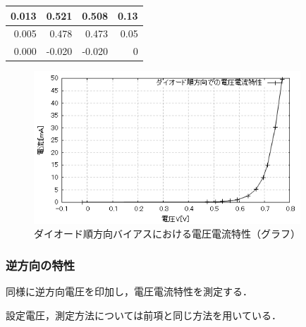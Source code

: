 \documentclass[titlepage]{jarticle}
\begin{document}
\begin{table}[htbp]
\begin{center}
\begin{tabular}{r|r|r|r}
            0.013                                    & 0.521                           & 0.508                                       & 0.13                         \\ \hline
            0.005                                    & 0.478                           & 0.473                                       & 0.05                         \\ \hline
            0.000                                    & -0.020                          & -0.020                                      & 0                            \\ \hline
        \end{tabular}
    \end{center}
    \label{ダイオード順方向バイアスにおける電圧電流特性測定結果}
\end{table}


\begin{figure}[H]
    \begin{center}
        \includegraphics[width=10cm]{graph/1.png}
        \caption{ダイオード順方向バイアスにおける電圧電流特性（グラフ）}
        \label{fig:ダイオード順方向バイアスにおける電圧電流特性（グラフ）}
    \end{center}
\end{figure}

\subsubsection{逆方向の特性}
同様に逆方向電圧を印加し，電圧電流特性を測定する．

設定電圧，測定方法については前項と同じ方法を用いている．
\end{document}
